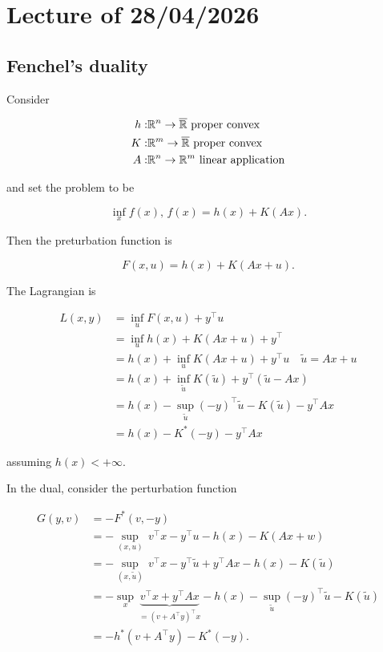 \chapter{Lecture \thechapter{} of 28/04/2026}

\section{Fenchel's duality}

Consider

\begin{align*}
    h:& {\mathbb{R}^n} \to \overline{\mathbb{R}} \text{ proper convex}\\
    K:& \mathbb{R}^m \to \overline{\mathbb{R}} \text{ proper convex} \\
    A:& {\mathbb{R}^n} \to \mathbb{R}^m \text{ linear application}
\end{align*}

and set the problem to be 

\[ \inf_x f(x),\, f(x) = h(x) + K(Ax). \]

Then the preturbation function is 

\[ F(x,u) = h(x) + K(Ax + u). \]

The Lagrangian is

\begin{align*}
    L(x,y) &= \inf_u F(x,u) + y^\top u \\
        &= \inf_u h(x) + K(Ax + u) + y^\top \\
        &= h(x) + \inf_u K(Ax + u) + y^\top u \quad \tilde{u} = Ax + u \\
        &= h(x) + \inf_{\tilde{u}} K(\tilde{u}) + y^\top (\tilde{u} - Ax) \\
        &= h(x) - \sup_{\tilde{u}} (-y)^\top \tilde{u} - K(\tilde{u}) - y^\top A x \\
        &= h(x) - K^*(-y) - y^\top Ax
\end{align*}

assuming $h(x) < +\infty$.

In the dual, consider the perturbation function 

\begin{align*}
    G(y,v) &= -F^*(v,-y) \\
        &= -\sup_{(x,u)}\, v^\top x - y^\top u - h(x) - K(Ax + w) \\
        &= -\sup_{(x,\tilde{u})}\, v^\top x - y^\top \tilde{u} + y^\top A x - h(x) - K(\tilde{u}) \\
        &= -\sup_{x} \, \underbrace{v^\top x + y^\top A x}_{=(v + A^\top y)^\top x} - h(x) - \sup_{\tilde{u}} (-y)^\top \tilde{u} - K(\tilde{u}) \\
        &= -h^*(v+A^\top y) - K^*(-y). 
\end{align*}

